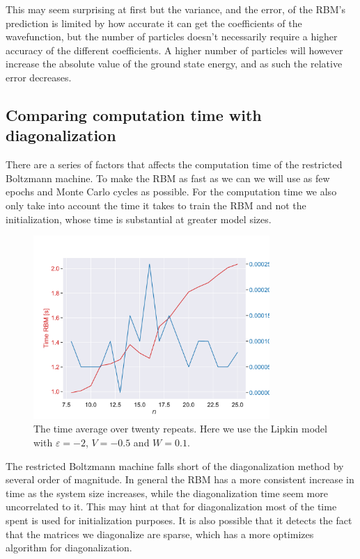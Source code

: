This may seem surprising at first but the variance, and the error, of the RBM's prediction is limited by how accurate it can get the coefficients of the wavefunction, but the number of particles doesn't necessarily require a higher accuracy of the different coefficients. A higher number of particles will however increase the absolute value of the ground state energy, and as such the relative error decreases.

\subsection{Comparing computation time with diagonalization}

There are a series of factors that affects the computation time of the restricted Boltzmann machine. To make the RBM as fast as we can we will use as few epochs and Monte Carlo cycles as possible. For the computation time we also only take into account the time it takes to train the RBM and not the initialization, whose time is substantial at greater model sizes. 

\begin{figure}[H]
  \begin{center}
    \includegraphics[width=0.8\textwidth]{Figures/Plots/Lipkin/[particles][8-25][e=500][eps=-2][V=-0.5][W=0.1]time.pdf}
  \end{center}
  \caption{The time average over twenty repeats. Here we use the Lipkin model with $\varepsilon=-2$, $V=-0.5$ and $W=0.1$.}
\end{figure}

The restricted Boltzmann machine falls short of the diagonalization method by several order of magnitude. In general the RBM has a more consistent increase in time as the system size increases, while the diagonalization time seem more uncorrelated to it. This may hint at that for diagonalization most of the time spent is used for initialization purposes. It is also possible that it detects the fact that the matrices we diagonalize are sparse, which has a more optimizes algorithm for diagonalization.




